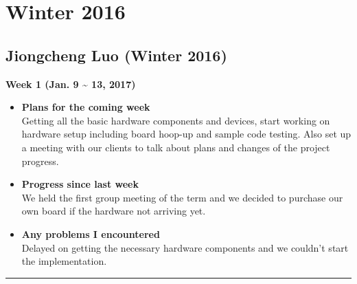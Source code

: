 \newpage
	\section{Winter 2016}

	\subsection{Jiongcheng Luo (Winter 2016)}
	\vspace{0.5cm}

	\begin{center}
		\textbf{Week 1 (Jan. 9 {\textasciitilde{}} 13, 2017)}
	\end{center}
	\begin{itemize}
		\item \textbf{Plans for the coming week}
		\\Getting all the basic hardware components and devices, start working on hardware setup including board hoop-up and sample code testing. Also set up a meeting with our clients to talk about plans and changes of the project progress.\\

		\item \textbf{Progress since last week}
		\\We held the first group meeting of the term and we decided to purchase our own board if the hardware not arriving yet.\\

		\item \textbf{Any problems I encountered}
		\\Delayed on getting the necessary hardware components and we couldn't start the implementation.\\
	\end{itemize}

	\rule{\textwidth}{0.5pt}

